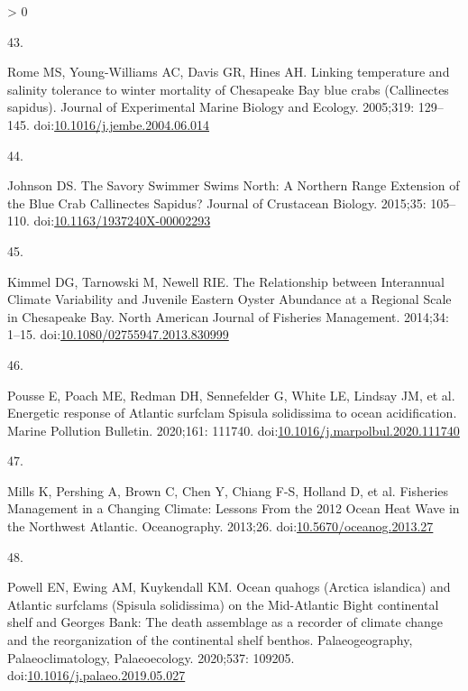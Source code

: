 \documentclass[
  10pt,
]{article}
\newlength{\cslhangindent}
\newlength{\csllabelwidth}
\newenvironment{CSLReferences}[2] %
 {%
  \setlength{\parindent}{0pt}
  \ifodd #1 \everypar{\setlength{\hangindent}{\cslhangindent}}\ignorespaces\fi
  \ifnum #2 > 0
  \setlength{\parskip}{#2\baselineskip}
  \fi
 }%
 {}
\newcommand{\CSLLeftMargin}[1]{\parbox[t]{\csllabelwidth}{#1}}
\newcommand{\CSLRightInline}[1]{\parbox[t]{\linewidth - \csllabelwidth}{#1}\break}
\begin{document}
\begin{CSLReferences}{0}{0}
\leavevmode\hypertarget{ref-rome_linking_2005}{}%
\CSLLeftMargin{43. }
\CSLRightInline{Rome MS, Young-Williams AC, Davis GR, Hines AH. Linking
temperature and salinity tolerance to winter mortality of {Chesapeake}
{Bay} blue crabs ({Callinectes} sapidus). Journal of Experimental Marine
Biology and Ecology. 2005;319: 129--145.
doi:\href{https://doi.org/10.1016/j.jembe.2004.06.014}{10.1016/j.jembe.2004.06.014}}

\leavevmode\hypertarget{ref-johnson_savory_2015}{}%
\CSLLeftMargin{44. }
\CSLRightInline{Johnson DS. The {Savory} {Swimmer} {Swims} {North}: {A}
{Northern} {Range} {Extension} of the {Blue} {Crab} {Callinectes}
{Sapidus}? Journal of Crustacean Biology. 2015;35: 105--110.
doi:\href{https://doi.org/10.1163/1937240X-00002293}{10.1163/1937240X-00002293}}

\leavevmode\hypertarget{ref-kimmel_relationship_2014}{}%
\CSLLeftMargin{45. }
\CSLRightInline{Kimmel DG, Tarnowski M, Newell RIE. The {Relationship}
between {Interannual} {Climate} {Variability} and {Juvenile} {Eastern}
{Oyster} {Abundance} at a {Regional} {Scale} in {Chesapeake} {Bay}.
North American Journal of Fisheries Management. 2014;34: 1--15.
doi:\href{https://doi.org/10.1080/02755947.2013.830999}{10.1080/02755947.2013.830999}}

\leavevmode\hypertarget{ref-pousse_energetic_2020}{}%
\CSLLeftMargin{46. }
\CSLRightInline{Pousse E, Poach ME, Redman DH, Sennefelder G, White LE,
Lindsay JM, et al. Energetic response of {Atlantic} surfclam {Spisula}
solidissima to ocean acidification. Marine Pollution Bulletin. 2020;161:
111740.
doi:\href{https://doi.org/10.1016/j.marpolbul.2020.111740}{10.1016/j.marpolbul.2020.111740}}

\leavevmode\hypertarget{ref-mills_fisheries_2013}{}%
\CSLLeftMargin{47. }
\CSLRightInline{Mills K, Pershing A, Brown C, Chen Y, Chiang F-S,
Holland D, et al. Fisheries {Management} in a {Changing} {Climate}:
{Lessons} {From} the 2012 {Ocean} {Heat} {Wave} in the {Northwest}
{Atlantic}. Oceanography. 2013;26.
doi:\href{https://doi.org/10.5670/oceanog.2013.27}{10.5670/oceanog.2013.27}}

\leavevmode\hypertarget{ref-powell_ocean_2020}{}%
\CSLLeftMargin{48. }
\CSLRightInline{Powell EN, Ewing AM, Kuykendall KM. Ocean quahogs
({Arctica} islandica) and {Atlantic} surfclams ({Spisula} solidissima)
on the {Mid}-{Atlantic} {Bight} continental shelf and {Georges} {Bank}:
{The} death assemblage as a recorder of climate change and the
reorganization of the continental shelf benthos. Palaeogeography,
Palaeoclimatology, Palaeoecology. 2020;537: 109205.
doi:\href{https://doi.org/10.1016/j.palaeo.2019.05.027}{10.1016/j.palaeo.2019.05.027}}


\end{CSLReferences}
\end{document}
